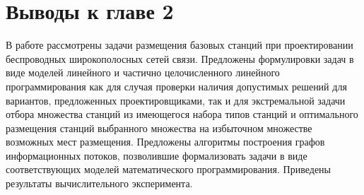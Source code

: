 \section{Выводы к главе 2}
В работе рассмотрены задачи размещения базовых станций при проектировании беспроводных широкополосных сетей связи. Предложены формулировки задач в виде   моделей линейного и частично целочисленного линейного программирования как для случая проверки  наличия допустимых решений для вариантов, предложенных проектировщиками, так и для экстремальной задачи отбора множества станций из имеющегося набора типов станций и оптимального размещения станций выбранного множества на избыточном множестве возможных мест размещения. Предложены алгоритмы построения графов информационных потоков, позволившие формализовать задачи в виде соответствующих моделей математического программирования. Приведены результаты вычислительного эксперимента.

























